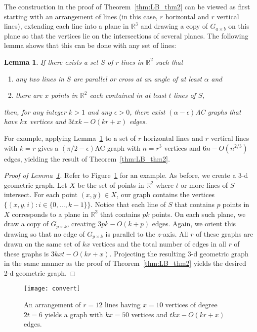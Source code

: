 \documentclass{patmorin}
\newtheorem{lem}{Lemma}
\newcommand{\figlabel}[1]{\label{fig:#1}}
\newcommand{\figref}[1]{\mbox{Figure~\ref{fig:#1}}}
\newcommand{\thmref}[1]{Theorem~\ref{thm:#1}}
\newcommand{\lemlabel}[1]{\label{lem:#1}}
\newcommand{\lemref}[1]{Lemma~\ref{lem:#1}}
\begin{document}
\newcommand{\R}{\mathbb{R}}
The construction in the proof of \thmref{LB_thm2} can be viewed as first
starting with an arrangement of lines (in this case, $r$ horizontal
and $r$ vertical lines), extending each line into a plane in $\R^3$ and
drawing a copy of $G_{a\times b}$ on this plane so that the vertices lie
on the intersections of several planes.  The following lemma shows that
this can be done with any set of lines:

\begin{lem}\lemlabel{convert}
If there exists a set $S$ of $r$ lines in $\R^2$ such that
\begin{enumerate}
\item any two lines in $S$ are parallel or cross at an angle of at least $\alpha$ and
\item there are $x$ points in $\R^2$ each contained in at least $t$ lines
of $S$, 
\end{enumerate}
then, for any integer $k>1$ and any $\epsilon>0$, there exist
$(\alpha-\epsilon)$AC graphs that have $kx$ vertices and $3txk - O(kr+x)$
edges.
\end{lem}

For example, applying \lemref{convert} to a set of $r$ horizontal lines
and $r$ vertical lines with $k=r$ gives a $(\pi/2-\epsilon)$AC graph
with $n=r^3$ vertices and $6n - O(n^{2/3})$ edges, yielding the result
of \thmref{LB_thm2}.

\begin{proof}[Proof of \lemref{convert}]
Refer to \figref{convert} for an example.  As before, we create a 3-d
geometric graph.  Let $X$ be the set of points in $\R^2$ where $t$ or
more lines of $S$ intersect.  For each point $(x,y)\in X$, our graph
contains the vertices $\{(x,y,i) : i\in\{0,\ldots,k-1\}\}$.  Notice that
each line of $S$ that contains $p$ points in $X$ corresponds to a plane
in $\R^3$ that contains $pk$ points.  On each such plane, we draw a
copy of $G_{p\times k}$, creating $3pk-O(k+p)$ edges. Again,
we orient this drawing so that no edge of $G_{p\times k}$ is parallel
to the $z$-axis.  All $r$ of these graphs are drawn on the same set of
$kx$ vertices and the total number of edges in all $r$ of these graphs
is $3kxt - O(kr + x)$.  Projecting the resulting 3-d geometric graph
in the same manner as the proof of \thmref{LB_thm2} yields the desired
2-d geometric graph.
\end{proof}

\begin{figure}
  \begin{center}
    \texttt{[image: convert]}
  \end{center}
  \caption{An arrangement of $r=12$ lines having $x=10$ vertices of
           degree $2t=6$ yields a graph with $kx=50$ vertices and 
           $tkx - O(kr+x)$ edges.}
  \figlabel{convert}
\end{figure}
\end{document}
